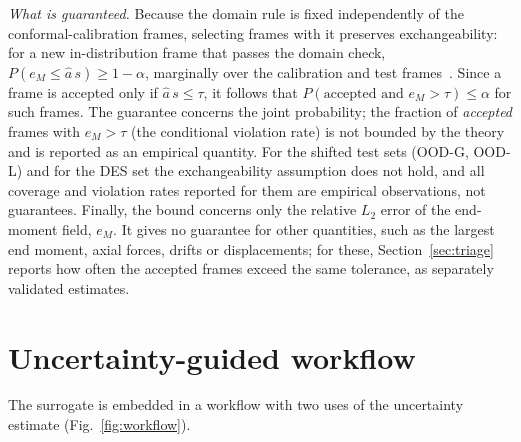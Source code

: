 \emph{What is guaranteed.} Because the domain rule is fixed independently of the conformal-calibration frames, selecting frames with it preserves exchangeability: for a new in-distribution frame that passes the domain check, $P(e_M\le \hat a\,s)\ge 1-\alpha$, marginally over the calibration and test frames~\cite{lei2018conformal}. Since a frame is accepted only if $\hat a\,s\le\tau$, it follows that $P(\text{accepted and } e_M>\tau)\le\alpha$ for such frames. The guarantee concerns the joint probability; the fraction of \emph{accepted} frames with $e_M>\tau$ (the conditional violation rate) is not bounded by the theory and is reported as an empirical quantity. For the shifted test sets (OOD-G, OOD-L) and for the DES set the exchangeability assumption does not hold, and all coverage and violation rates reported for them are empirical observations, not guarantees. Finally, the bound concerns only the relative $L_2$ error of the end-moment field, $e_M$. It gives no guarantee for other quantities, such as the largest end moment, axial forces, drifts or displacements; for these, Section~\ref{sec:triage} reports how often the accepted frames exceed the same tolerance, as separately validated estimates.

\section{Uncertainty-guided workflow}\label{sec:workflow}

The surrogate is embedded in a workflow with two uses of the uncertainty estimate (Fig.~\ref{fig:workflow}).

